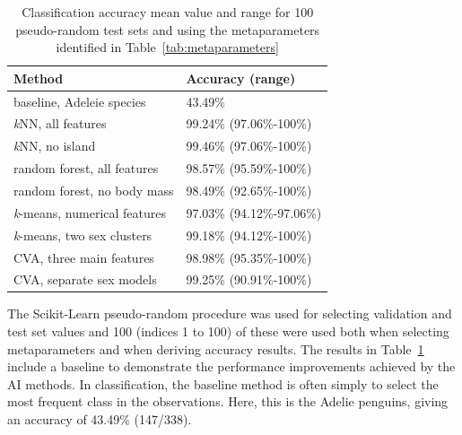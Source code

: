 \documentclass[a4paper, 11pt]{article}
\begin{document}
\begin{table} %
  \small
  \begin{center}
  \vspace{-3\baselineskip} %
  \setlength{\abovecaptionskip}{5pt}
  \setlength{\belowcaptionskip}{5pt}
  \fontsize{10}{10}\selectfont %
  \begin{tabular}{l|l}
  \textbf{Method} & \textbf{Accuracy (range)}\\
  \hline
  baseline, Adeleie species & 43.49\% \\
  \hline
  \textit{k}NN, all features & 99.24\% (97.06\%-100\%)\\
  \textit{k}NN, no island &	99.46\% (97.06\%-100\%)\\
  \hline
  random forest, all features	& 98.57\% (95.59\%-100\%)\\
  random forest, no body mass & 98.49\% (92.65\%-100\%)\\
  \hline
  \textit{k}-means, numerical features & 97.03\% (94.12\%-97.06\%)\\
  \textit{k}-means, two sex clusters  & 99.18\% (94.12\%-100\%)\\
  \hline
  CVA, three main features & 98.98\% (95.35\%-100\%)\\
  CVA, separate sex models & 99.25\% (90.91\%-100\%)\\
  \hline
  \end{tabular}
  \vspace{-2\baselineskip} %
  \end{center} 
  \caption{\centering\linespread{0.8}\selectfont Classification accuracy mean value and range for 100 pseudo-random test sets 
  and using the metaparameters identified in Table~\ref{tab:metaparameters}}
  \vspace{0\baselineskip} %
  \label{tab:results}
\end{table} 

The Scikit-Learn 
pseudo-random procedure was used for selecting validation and test set values and 100 (indices 1 to 100) of these were used 
both when selecting metaparameters and when deriving accuracy results.
The results in Table~\ref{tab:results} include a baseline to demonstrate the 
performance improvements achieved by the AI methods. In classification, the
baseline method is often simply to select the most frequent class in the observations. Here, 
this is the Adelie penguins, giving an accuracy of 43.49\% (147/338). 
\end{document}
